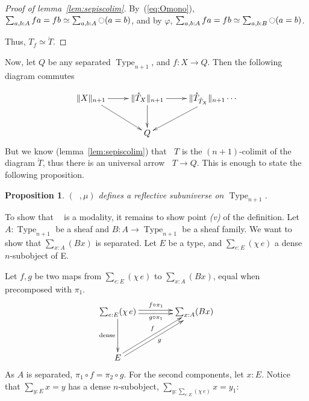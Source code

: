 \documentclass[preprint,9pt,numbers]{sigplanconf}
\makeatletter
\newtheorem{prop}[thm]{Proposition}
\def\dar[#1]#2{\ar@<-#2>[#1]\ar@<#2>[#1]} %
\def\tar[#1]#2{\ar@<#2>[#1]\ar@<0pt>[#1]\ar@<-#2>[#1]} %
\DeclareMathOperator{\Type}{Type}
\newcommand{\modal}{\ensuremath{\ocircle}}
\newcommand \separated {\mathop{\square_{n+1}} }
\newenvironment{mymath}[1][-0em]{%
  \newcommand\mymathaux{\vspace{#1}}%
  \vspace{#1}%
  \begin{equation*}%
  }{ %
    \mymathaux%
  \end{equation*}}
\makeatother
\begin{document}
\begin{proof}[Proof of lemma~\ref{lem:sepiscolim}]
  By~(\ref{eq:Omono}), $\sum_{a,b:A} f a = f b \simeq \sum_{a,b:A} \modal
  (a=b)$, and by $\varphi$, $\sum_{a,b:A} f a = f b \simeq
  \sum_{a,b:B} \modal ( a = b)$.

Thus, $T_f \simeq \mathring T$.
\end{proof}

Now, let $Q$ be any separated $\Type_{n+1}$, and $f:X \to Q$. Then the
following diagram commutes

\begin{mymath}\xymatrix{
\|X\|_{n+1} \ar[r] \ar[rd] & \|\mathring T_{X}\|_{n+1} \ar[r] \ar[d] & \|\mathring
  T_{\mathring T_X} \|_{n+1} \ar[ld]\cdots \\
  & Q &
} \end{mymath}%
But we know (lemma~\ref{lem:sepiscolim}) that $\separated T$ is the
$(n+1)$-colimit of the diagram $\mathring T$, thus there is an universal
arrow $\separated T \to Q$.
%
This is enough to state the following proposition.
\begin{prop}\label{prop:sep-subu}
  $(\separated,\mu)$ defines a reflective subuniverse on $\Type_{n+1}$.
\end{prop}

To show that $\separated$ is a modality, it remains to show point
{\it (v)} of the definition.
%
Let $A:\Type_{n+1}$ be a sheaf and $B:A \to \Type_{n+1}$ be a sheaf
family. We want to show that $\sum_{x:A} (Bx)$ is separated. Let $E$
be a type, and $\sum_{e:E} (\chi\,e)$ a dense $n$-subobject of E.

Let $f,g$ be two maps from $\sum_{e:E} (\chi\,e)$ to $\sum_{x:A}
(Bx)$, equal when precomposed with $\pi_1$.
\begin{mymath}\xymatrix @R=4em @C=4em{
  \sum_{e:E} (\chi\, e) \ar@<-2pt>[r]_{g\circ\pi_1} \ar@<2pt>[r]^{f\circ \pi_1} \ar[d]_{\mathrm{dense}}& \sum_{x :A} (Bx) \\
  E \ar@<-2pt>[ru]_{g} \ar@<2pt>[ru]^{f}&
}\end{mymath}%
As $A$ is separated, $\pi_1\circ f = \pi_2 \circ g$.
For the second components, let $x:E$. Notice that 
$\sum_{y:E} x = y$ has a dense $n$-subobject, $\sum_{y:\sum_{e:E} (\chi\,
  e)} x=y_1$:
\end{document}
